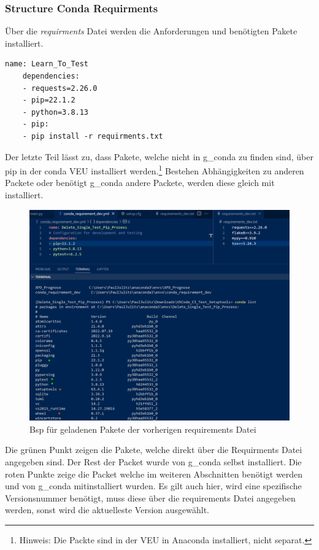 \subsubsection{Structure Conda Requirments} Über die \textit{requirments} Datei werden die Anforderungen und benötigten Pakete installiert. 

\begin{lstlisting}[style=Config, caption={Beispiel Conda-Requirmentsdatei}, captionpos=b]
	name: Learn_To_Test
	dependencies:
	- requests=2.26.0
	- pip=22.1.2
	- python=3.8.13
	- pip:
	- pip install -r requirments.txt
\end{lstlisting}
Der letzte Teil lässt zu, dass Pakete, welche nicht in \gls{g_conda} zu finden sind, über pip in der conda \gls{VEU} installiert werden.\footnote{Hinweis: Die Packte sind in der \gls{VEU} in Anaconda installiert, nicht separat.} Bestehen Abhängigkeiten zu anderen Packete oder benötigt \gls{g_conda} andere Packete, werden diese gleich mit installiert. 

\begin{figure}[H]
	\centering
	\includegraphics[scale = 0.2]{attachment/chapter_2/Scc084}
	\caption{Bsp für geladenen Pakete der vorherigen requirements Datei}
\end{figure}

Die grünen Punkt zeigen die Pakete, welche direkt über die Requirments Datei angegeben sind. Der Rest der Packet wurde von \gls{g_conda} selbst installiert. Die roten Punkte zeige die Packet welche im weiteren Abschnitten benötigt werden und von \gls{g_conda} mitinstalliert wurden. Es gilt auch hier, wird eine spezifische Versionsnummer benötigt, muss diese über die requirements Datei angegeben werden, sonst wird die aktuelleste Version ausgewählt.\\

